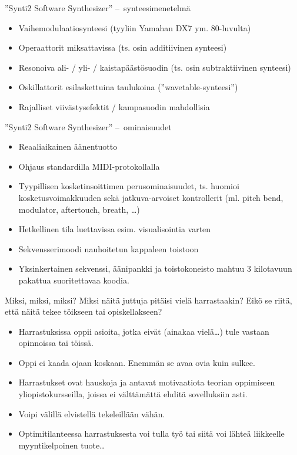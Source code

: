 \documentclass[pdf,10pt]{beamer}
\begin{document}
\begin{frame}{''Synti2 Software Synthesizer'' --~synteesimenetelmä}

  \begin{itemize}
  \item Vaihemodulaatiosynteesi (tyyliin Yamahan DX7 ym. 80-luvulta)
  \item Operaattorit miksattavissa (ts. osin additiivinen synteesi)
  \item Resonoiva ali- / yli- / kaistapäästösuodin (ts. osin
    subtraktiivinen synteesi)
  \item Oskillattorit esilaskettuina taulukoina
    (''wavetable-synteesi'')
  \item Rajalliset viivästysefektit / kampasuodin mahdollisia
  \end{itemize}
\end{frame}

\begin{frame}{''Synti2 Software Synthesizer'' --~ominaisuudet}
  \begin{itemize}
  \item Reaaliaikainen äänentuotto 
  \item Ohjaus standardilla MIDI-protokollalla
  \item Tyypillisen kosketinsoittimen perusominaisuudet, ts. huomioi
    kosketusvoimakkuuden sekä jatkuva-arvoiset kontrollerit (ml. pitch
    bend, modulator, aftertouch, breath, \ldots)
  \item Hetkellinen tila luettavissa esim. visualisointia varten
  \item Sekvensserimoodi nauhoitetun kappaleen toistoon
  \item Yksinkertainen sekvenssi, äänipankki ja toistokoneisto mahtuu
    3 kilotavuun pakattua suoritettavaa koodia.
  \end{itemize}
\end{frame}

\begin{frame}{Miksi, miksi, miksi?}
  Miksi näitä juttuja pitäisi vielä harrastaakin? Eikö se riitä, että
  näitä tekee töikseen tai opiskellakseen?
  \begin{itemize}
    \item Harrastuksissa oppii asioita, jotka eivät (ainakaa
      vielä\ldots) tule vastaan opinnoissa tai töissä.
    \item Oppi ei kaada ojaan koskaan. Enemmän se avaa ovia kuin
      sulkee.
    \item Harrastukset ovat hauskoja ja antavat motivaatiota teorian
      oppimiseen yliopistokursseilla, joissa ei välttämättä ehditä
      sovelluksiin asti.
    \item Voipi välillä elvistellä tekeleillään vähän.
    \item Optimitilanteessa harrastuksesta voi tulla työ tai siitä voi
      lähteä liikkeelle myyntikelpoinen tuote\ldots
  \end{itemize}
\end{frame}
\end{document}
